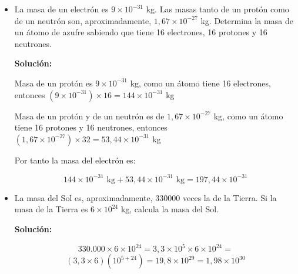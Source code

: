 \documentclass[12pt,a4paper]{article}
\begin{document}
\begin{itemize}
\item La masa de un electrón es $9 \times 10^{-31}$ kg. Las masas tanto de un protón como de un neutrón son, aproximadamente, $1,67 \times 10^{-27}$ kg. Determina la masa de un átomo de azufre sabiendo que tiene 16 electrones, 16 protones y 16 neutrones.

\vspace{0.5cm}

\textbf{Solución:}

Masa de un protón es $9 \times 10^{-31}$ kg, como un átomo tiene 16 electrones, entonces $(9 \times 10^{-31}) \times 16 = 144 \times 10^{-31}$ kg

Masa de un protón y de un neutrón es de $1,67 \times 10^{-27}$ kg, como un átomo tiene 16 protones y 16 neutrones, entonces $(1,67 \times 10^{-27}) \times 32 = 53,44 \times 10^{-31}$ kg

Por tanto la masa del electrón es:

$$144 \times 10^{-31}\text{ kg} + 53,44 \times 10^{-31}\text{ kg} = 197,44 \times 10^{-31}$$

\vspace{0.5cm}

\item La masa del Sol es, aproximadamente, 330000 veces la de la Tierra. Si la masa de la Tierra es $6 \times 10^{24}$ kg, calcula la masa del Sol.

\vspace{0.5cm}

\textbf{Solución:}

$$330.000 \times 6 \times 10^{24} = 3,3 \times 10^5 \times 6 \times 10^{24} =$$
$$(3,3 \times 6)(10^{5+24}) = 19,8 \times 10^{29} = 1,98 \times 10^{30}$$
\end{itemize}

\vspace{1cm}
\end{document}
